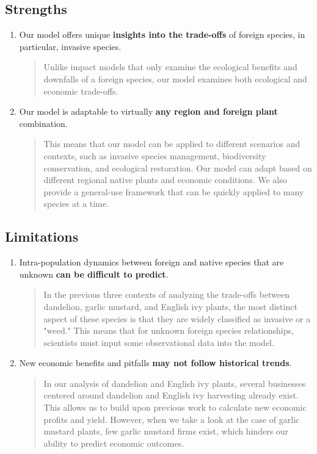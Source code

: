 \subsection{Strengths}
\begin{enumerate}
    \item Our model offers unique\textbf{ insights into the trade-offs} of foreign species, in particular, invasive species.
    \begin{quote}
        Unlike impact models that only examine the ecological benefits and downfalls of a foreign species, our model examines both ecological and economic trade-offs.
    \end{quote}
    \item Our model is adaptable to virtually \textbf{any region and foreign plant} combination.
    \begin{quote}
        This means that our model can be applied to different scenarios and contexts, such as invasive species management, biodiversity conservation, and ecological restoration. Our model can adapt based on different regional native plants and economic conditions. We also provide a general-use framework that can be quickly applied to many species at a time.
    \end{quote}
\end{enumerate}
\subsection{Limitations}
\begin{enumerate}
\item Intra-population dynamics between foreign and native species that are unknown \textbf{can be difficult to predict}.
    \begin{quote}
     In the previous three contexts of analyzing the trade-offs between dandelion, garlic mustard, and English ivy plants, the most distinct aspect of these species is that they are widely classified as invasive or a "weed." This means that for unknown foreign species relationships, scientists must input some observational data into the model.
    \end{quote}
\item New economic benefits and pitfalls \textbf{may not follow historical trends}.
\begin{quote}
    In our analysis of dandelion and English ivy plants, several businesses centered around dandelion and English ivy harvesting already exist. This allows us to build upon previous work to calculate new economic profits and yield. However, when we take a look at the case of garlic mustard plants, few garlic mustard firms exist, which hinders our ability to predict economic outcomes.
\end{quote}
    
\end{enumerate}

